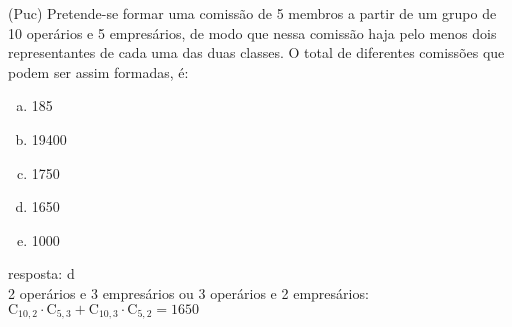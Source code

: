 \begin{ex}
 (Puc) Pretende-se formar uma comissão de 5 membros a partir de um grupo de 10 operários e 5 empresários, de modo que nessa comissão haja pelo menos dois representantes de cada uma das duas classes. O total de diferentes comissões que podem ser assim formadas, é:
    \begin{enumerate}[(a)]
    \item 185
    \item 19400
    \item 1750
    \item 1650
    \item 1000
    \end{enumerate}
      \begin{sol}
       resposta: d \\
       2 operários e 3 empresários ou 3 operários e 2 empresários:\\
       $\mathrm{C}_{{10},2}\cdot\mathrm{C}_{5,3}+\mathrm{C}_{{10},3}\cdot\mathrm{C}_{5,2}=1650$
      \end{sol}
\end{ex}